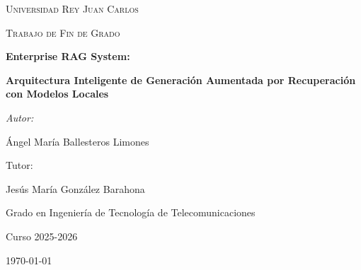 \begin{titlepage}
    \centering
    \vspace*{1cm}
    
    {\scshape\LARGE Universidad Rey Juan Carlos \par}
    \vspace{1.5cm}
    {\scshape\Large Trabajo de Fin de Grado\par}
    \vspace{1.5cm}
    
    {\Huge\bfseries Enterprise RAG System:\par}
    {\Large\bfseries Arquitectura Inteligente de Generación Aumentada por Recuperación con Modelos Locales\par}
    
    \vspace{2cm}
    {\Large\itshape Autor:\par}
    {\Large Ángel María Ballesteros Limones\par}
    
    \vfill
    {\large Tutor:\par}
    {\large Jesús María González Barahona\par}
    
    \vfill
    {\large Grado en Ingeniería de Tecnología de Telecomunicaciones\par}
    {\large Curso 2025-2026\par}
    {\large \today\par}
    
\end{titlepage}
